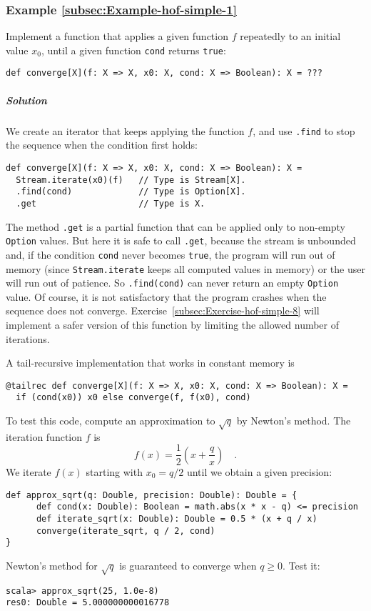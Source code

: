 \subsubsection{Example \label{subsec:Example-hof-simple-1}\ref{subsec:Example-hof-simple-1}}

Implement a function that applies a given function $f$ repeatedly
to an initial value $x_{0}$, until a given function \lstinline!cond!
returns \lstinline!true!:
\begin{lstlisting}
def converge[X](f: X => X, x0: X, cond: X => Boolean): X = ???
\end{lstlisting}


\subparagraph{Solution}

We create an iterator that keeps applying the function $f$, and use
\lstinline!.find! to stop the sequence when the condition first holds:
\begin{lstlisting}
def converge[X](f: X => X, x0: X, cond: X => Boolean): X = 
  Stream.iterate(x0)(f)   // Type is Stream[X].
  .find(cond)             // Type is Option[X].
  .get                    // Type is X.
\end{lstlisting}
The method \lstinline!.get! is a partial
function that can be applied only to non-empty \lstinline!Option!
values. But here it is safe to call \lstinline!.get!, because the
stream is unbounded and, if the condition \lstinline!cond! never
becomes \lstinline!true!, the program will run out of memory (since
\lstinline!Stream.iterate! keeps all computed values in memory) or
the user will run out of patience. So \lstinline!.find(cond)! can
never return an empty \lstinline!Option! value. Of course, it is
not satisfactory that the program crashes when the sequence does not
converge. Exercise~\ref{subsec:Exercise-hof-simple-8} will implement
a safer version of this function by limiting the allowed number of
iterations.

A tail-recursive implementation that works in constant memory is 
\begin{lstlisting}
@tailrec def converge[X](f: X => X, x0: X, cond: X => Boolean): X =
  if (cond(x0)) x0 else converge(f, f(x0), cond)
\end{lstlisting}
To test this code, compute an approximation to $\sqrt{q}$ by Newton's
method. The iteration function $f$ is 
\[
f(x)=\frac{1}{2}\left(x+\frac{q}{x}\right)\quad.
\]
We iterate $f(x)$ starting with $x_{0}=q/2$ until we obtain a given
precision:
\begin{lstlisting}
def approx_sqrt(q: Double, precision: Double): Double = {
      def cond(x: Double): Boolean = math.abs(x * x - q) <= precision
      def iterate_sqrt(x: Double): Double = 0.5 * (x + q / x)
      converge(iterate_sqrt, q / 2, cond)
}
\end{lstlisting}
Newton's method for $\sqrt{q}$ is guaranteed to converge when $q\geq0$.
Test it:
\begin{lstlisting}
scala> approx_sqrt(25, 1.0e-8)
res0: Double = 5.000000000016778
\end{lstlisting}


